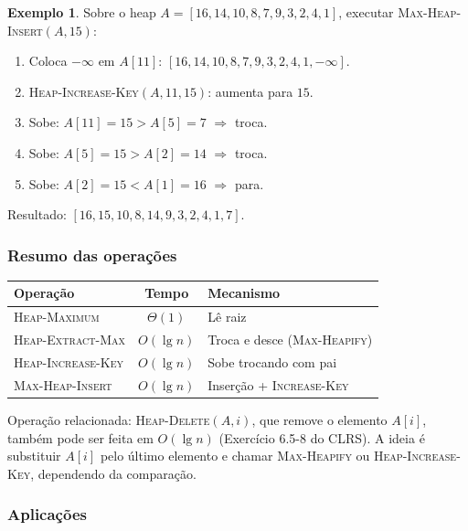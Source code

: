 \documentclass[9pt,a4paper]{extarticle}
\newcommand{\ntc}[1]{\textcolor{notice}{#1}}
\theoremstyle{definition}
\newtheorem{example}{Exemplo}[section]
\begin{document}
\begin{example}
Sobre o heap $A = [16, 14, 10, 8, 7, 9, 3, 2, 4, 1]$, executar
\textsc{Max-Heap-Insert}$(A, 15)$:
\begin{enumerate}
  \item Coloca $-\infty$ em $A[11]$: $[16, 14, 10, 8, 7, 9, 3, 2, 4, 1, -\infty]$.
  \item \textsc{Heap-Increase-Key}$(A, 11, 15)$: aumenta para $15$.
  \item Sobe: $A[11] = 15 > A[5] = 7$ $\Rightarrow$ troca.
  \item Sobe: $A[5] = 15 > A[2] = 14$ $\Rightarrow$ troca.
  \item Sobe: $A[2] = 15 < A[1] = 16$ $\Rightarrow$ para.
\end{enumerate}
Resultado: $[16, 15, 10, 8, 14, 9, 3, 2, 4, 1, 7]$.
\end{example}
 
\subsubsection{Resumo das operações}
 
\begin{center}
\begin{tabular}{l c l}
\toprule
\textbf{Operação} & \textbf{Tempo} & \textbf{Mecanismo} \\
\midrule
\textsc{Heap-Maximum}        & $\Theta(1)$   & Lê raiz \\
\textsc{Heap-Extract-Max}    & $O(\lg n)$    & Troca e desce (\textsc{Max-Heapify}) \\
\textsc{Heap-Increase-Key}   & $O(\lg n)$    & Sobe trocando com pai \\
\textsc{Max-Heap-Insert}     & $O(\lg n)$    & Inserção + \textsc{Increase-Key} \\
\bottomrule
\end{tabular}
\end{center}
 
\ntc{Operação relacionada:} \textsc{Heap-Delete}$(A, i)$, que remove o
elemento $A[i]$, também pode ser feita em $O(\lg n)$ (Exercício 6.5-8
do CLRS). A ideia é substituir $A[i]$ pelo último elemento e chamar
\textsc{Max-Heapify} ou \textsc{Heap-Increase-Key}, dependendo da
comparação.
 
\subsubsection{Aplicações}
 
\end{document}
